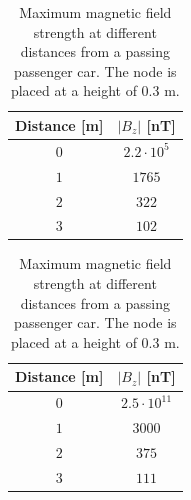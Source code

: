 \begin{table}
\begin{minipage}{0.45\linewidth}
   \begin{center}
   \caption[Simulated magnetic field strength versus distance. Sensor in road surface.]{Maximum magnetic field strength at different distances from a passing passenger car. The node is placed in the road surface.}\vspace{2mm}
\label{tbl:strength1}
    \begin{tabular}{ c c }\toprule
      \textbf{Distance} [m] & $|B_z|$ [nT]\\ \midrule
      $0$ & $2.2 \cdot 10^5$ \\
      $1$ & $1765$ \\
      $2$ & $322$\\
      $3$ &$102$\\ \bottomrule
    \end{tabular}
  \end{center}
  \end{minipage}\hfill
  \begin{minipage}{0.45\linewidth}
      \begin{center}
   \caption[Simulated magnetic field strength versus distance. Sensor at 0.3 m.]{Maximum magnetic field strength at different distances from a passing passenger car. The node is placed at a height of 0.3 m.}
   \vspace{2mm}
\label{tbl:strength2}
    \begin{tabular}{cc}\toprule
      \textbf{Distance} [m] & $|B_z|$ [nT]\\ \midrule
      $0$ & $2.5 \cdot 10^{11}$ \\
      $1$ & $3000$ \\
      $2$ & $375$\\
      $3$ & $111$\\ \bottomrule
    \end{tabular}
  \end{center}
  \end{minipage}
\end{table}


